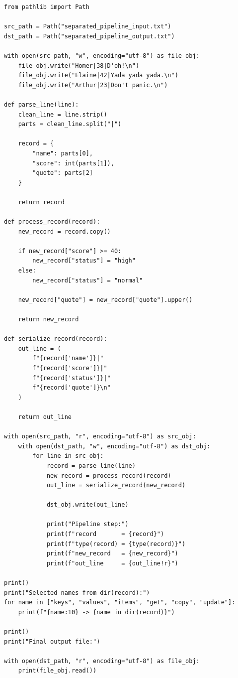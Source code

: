 \begin{verbatim}
from pathlib import Path

src_path = Path("separated_pipeline_input.txt")
dst_path = Path("separated_pipeline_output.txt")

with open(src_path, "w", encoding="utf-8") as file_obj:
    file_obj.write("Homer|38|D'oh!\n")
    file_obj.write("Elaine|42|Yada yada yada.\n")
    file_obj.write("Arthur|23|Don't panic.\n")

def parse_line(line):
    clean_line = line.strip()
    parts = clean_line.split("|")

    record = {
        "name": parts[0],
        "score": int(parts[1]),
        "quote": parts[2]
    }

    return record

def process_record(record):
    new_record = record.copy()

    if new_record["score"] >= 40:
        new_record["status"] = "high"
    else:
        new_record["status"] = "normal"

    new_record["quote"] = new_record["quote"].upper()

    return new_record

def serialize_record(record):
    out_line = (
        f"{record['name']}|"
        f"{record['score']}|"
        f"{record['status']}|"
        f"{record['quote']}\n"
    )

    return out_line

with open(src_path, "r", encoding="utf-8") as src_obj:
    with open(dst_path, "w", encoding="utf-8") as dst_obj:
        for line in src_obj:
            record = parse_line(line)
            new_record = process_record(record)
            out_line = serialize_record(new_record)

            dst_obj.write(out_line)

            print("Pipeline step:")
            print(f"record       = {record}")
            print(f"type(record) = {type(record)}")
            print(f"new_record   = {new_record}")
            print(f"out_line     = {out_line!r}")

print()
print("Selected names from dir(record):")
for name in ["keys", "values", "items", "get", "copy", "update"]:
    print(f"{name:10} -> {name in dir(record)}")

print()
print("Final output file:")

with open(dst_path, "r", encoding="utf-8") as file_obj:
    print(file_obj.read())
\end{verbatim}


